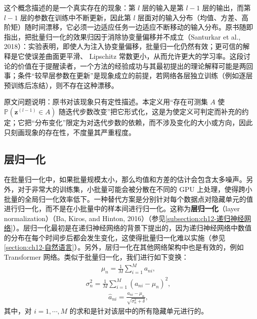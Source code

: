 \documentclass[../../main.tex]{subfiles}
\begin{document}
\begin{remark}
这个概念描述的是一个真实存在的现象：第 $l$ 层的输入是第 $l-1$ 层的输出，而第 $l-1$ 层的参数在训练中不断更新，因此第 $l$ 层面对的输入分布（均值、方差、高阶矩）随时间漂移，它必须一边适应任务一边适应不断移动的输入分布。原书随即指出，把批量归一化的效果归因于消除协变量偏移并不成立（Santurkar et al., 2018）：实验表明，即使人为注入协变量偏移，批量归一化仍然有效；更可信的解释是它使误差曲面更平滑、 Lipschitz 常数更小，从而允许更大的学习率。这段讨论的价值在于提醒读者，一个方法的经验成功与其最初提出的理论解释可能是两回事；条件“较早层参数在更新”是现象成立的前提，若网络各层独立训练（例如逐层预训练后冻结），则不存在这种漂移。

原文问题说明：原书对该现象只有定性描述。本定义用“存在可测集 $A$ 使 $\mathbb{P}(\boldsymbol{z}^{(l-1)}\in A)$ 随迭代步数改变”把它形式化，这是为使定义可判定而补充的约定；它把“分布变化”限定为对迭代步数的依赖，而不涉及变化的大小或方向，因此只刻画现象的存在性，不度量其严重程度。
\end{remark}

\subsection{层归一化}\label{subsection:ch07-层归一化}

在批量归一化中，如果批量规模太小，那么均值和方差的估计会包含太多噪声。另外，对于非常大的训练集，小批量可能会被分散在不同的 GPU 上处理，使得跨小批量的全局归一化效率低下。一种替代方案是分别针对每个数据点对隐藏单元的值进行归一化，而不是在小批量中的样本间进行归一化。这称为\textbf{层归一化}（layer normalization）（Ba, Kiros, and Hinton, 2016）（参见\cref{subsection:ch12-递归神经网络}）。层归一化最初是在递归神经网络的背景下提出的，因为递归神经网络中数值的分布在每个时间步后都会发生变化，这使得批量归一化难以实施（参见\cref{section:ch12-自然语言}）。另外，层归一化在其他网络架构中也是有效的，例如 Transformer 网络。类似于批量归一化，我们进行如下变换：
\begin{align}
\mu_n = \frac{1}{M}\sum_{i=1}^{M}a_{ni},
\label{align:ch07-层均值}
\end{align}
\begin{align}
\sigma_n^{2} = \frac{1}{M}\sum_{i=1}^{M}(a_{ni}-\mu_n)^{2},
\label{align:ch07-层方差}
\end{align}
\begin{align}
\hat{a}_{ni} = \frac{a_{ni}-\mu_n}{\sqrt{\sigma_n^{2}+\delta}},
\label{align:ch07-层标准化}
\end{align}
其中，对 $i=1,\cdots,M$ 的求和是针对该层中的所有隐藏单元进行的。
\end{document}
